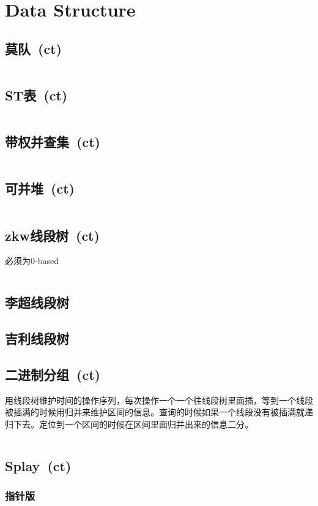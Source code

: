\chapter{Data Structure}
\section{莫队\ \small(ct)}
	\inputminted{cpp}{DataStructure/mo_dui.cpp}
\section{ST表\ \small(ct)}
	\inputminted{cpp}{DataStructure/st_table.cpp}
\section{带权并查集\ \small(ct)}
	\inputminted{cpp}{DataStructure/union_find_weighted.cpp}
\section{可并堆\ \small(ct)}
	\inputminted{cpp}{DataStructure/mergeable_heap.cpp}
\section{zkw线段树\ \small(ct)}
	必须为$ 0 $-based
	\inputminted{cpp}{DataStructure/zkw_segment_tree.cpp}
\section{李超线段树}
\section{吉利线段树}
\section{二进制分组\ \small(ct)}
	用线段树维护时间的操作序列，每次操作一个一个往线段树里面插，等到一个线段被插满的时候用归并来维护区间的信息。查询的时候如果一个线段没有被插满就递归下去。定位到一个区间的时候在区间里面归并出来的信息二分。
	\inputminted{cpp}{DataStructure/binary_group.cpp}
\section{Splay\ \small(ct)}
	\subsection*{指针版}
		\inputminted{cpp}{DataStructure/splay.cpp}
